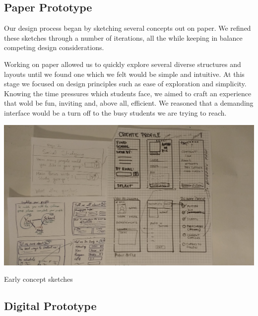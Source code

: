 \documentclass{sigchi-ext}
\begin{document}
\subsection{Paper Prototype}

Our design process began by sketching several concepts out on paper. We refined
these sketches through a number of iterations, all the while keeping in balance
competing design considerations.

Working on paper allowed us to quickly explore several diverse structures and
layouts until we found one which we felt would be simple and intuitive. At this
stage we focused on design principles such as ease of exploration and simplicity.
Knowing the time pressures which students face, we aimed to craft an experience
that wold be fun, inviting and, above all, efficient. We reasoned that a
demanding interface would be a turn off to the busy students we are trying to
reach.

\begin{marginfigure}[-24pc]
  \begin{minipage}{\marginparwidth}
    \centering
	  \includegraphics[width=0.7\marginparwidth]{figures/paper_prototype.jpg}
    \caption{Early concept sketches}
  \end{minipage}
\end{marginfigure}



\subsection{Digital Prototype}
\end{document}
